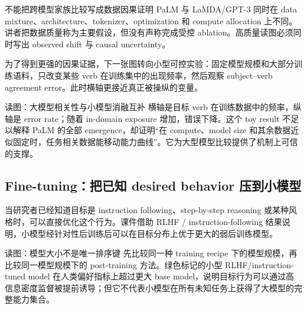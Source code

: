 
\begin{warningbox}{不能把跨模型家族比较写成数据因果证明}
PaLM 与 LaMDA/GPT-3 同时在 data mixture、architecture、tokenizer、optimization 和 compute allocation 上不同。讲者把数据质量称为主要假设，但没有声称完成受控 ablation。高质量读图必须同时写出 observed shift 与 causal uncertainty。
\end{warningbox}

为了得到更强的因果证据，下一张图转向小型可控实验：固定模型规模和大部分训练语料，只改变某些 verb 在训练集中的出现频率，然后观察 subject--verb agreement error。此时横轴更接近真正被操纵的变量。


\begin{knowledgebox}{读图：大模型相关性与小模型消融互补}
横轴是目标 verb 在训练数据中的频率，纵轴是 error rate；随着 in-domain exposure 增加，错误下降。这个 toy result 不足以解释 PaLM 的全部 emergence，却证明“在 compute、model size 和其余数据近似固定时，任务相关数据能移动能力曲线”。它为大型模型比较提供了机制上可信的支撑。
\end{knowledgebox}


\subsection{Fine-tuning：把已知 desired behavior 压到小模型}

当研究者已经知道目标是 instruction following、step-by-step reasoning 或某种风格时，可以直接优化这个行为。课件借助 RLHF / instruction-following 结果说明，小模型经针对性后训练后可以在目标分布上优于更大的弱后训练模型。


\begin{knowledgebox}{读图：模型大小不是唯一排序键}
先比较同一种 training recipe 下的模型规模，再比较同一模型规模下的 post-training 方法。绿色标记的小型 RLHF/instruction-tuned model 在人类偏好指标上超过更大 base model，说明目标行为可以通过高信息密度监督被提前诱导；但它不代表小模型在所有未知任务上获得了大模型的完整能力集合。
\end{knowledgebox}

